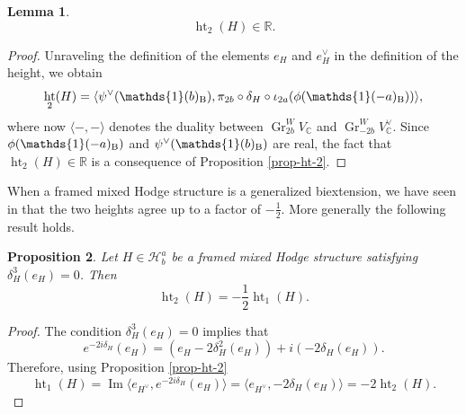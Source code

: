 \documentclass[11pt,a4paper]{amsart}
\newcommand{\Betti}{\text{\rm B}}
\newcommand{\C}{\mathds{C}}
\newcommand{\R}{\mathds{R}}
\newcommand{\caH}{\mathcal{H}}
\newcommand{\bfone}{{\mathds{1}}}
\DeclareMathOperator {\Gr} {Gr}
\DeclareMathOperator{\im}{Im}
\DeclareMathOperator{\Ht}{ht}
\numberwithin{equation}{section}
\theoremstyle{plain}
\newtheorem{prop}{Proposition}[section]
\newtheorem{lem}[prop]{Lemma}
\theoremstyle{definition}
\begin{document}
\begin{lem}\label{lem-2-17}
  \begin{displaymath}
    \Ht_{2}(H)\in \R.
  \end{displaymath}
\end{lem}
\begin{proof}
  Unraveling the definition of the elements $e_H$ and $e_{H}^{\vee}$
  in the definition of the height, we obtain
  \begin{displaymath}
    \Ht_{2}(H)= \langle\psi ^{\vee}(\bfone(b)_{\Betti}),
    \pi _{2b}\circ \delta _{H}\circ \iota _{2a}(\phi (\bfone(-a)_{\Betti}))\rangle,
  \end{displaymath}
  where now $\langle -,- \rangle $ denotes the duality between
  $\Gr_{2b}^{W}V_{\C}$ and $\Gr_{-2b}^{W}V^{\vee}_{\C}$.  Since
  $\phi (\bfone(-a)_{\Betti})$ and $\psi ^{\vee}(\bfone(b)_{\Betti})$ are real, the fact
  that $\Ht_{2}(H)\in \R$ is a consequence of Proposition
  \ref{prop-ht-2}.
\end{proof}

When a framed mixed Hodge structure is a generalized  biextension,
we have seen in \cite[Lemma 2.6]{BGGP:Height} that the two heights
agree up to a factor of $-\frac{1}{2}$.  More generally the following result
holds.

\begin{prop}\label{prop:1} Let $H\in \caH^{a}_{b}$ be a framed mixed Hodge
  structure satisfying $\delta _{H}^{3}(e_H)=0$. Then
  \begin{displaymath}
    \Ht_{2}(H)=-\frac{1}{2}\Ht_{1}(H).
  \end{displaymath}
\end{prop}
\begin{proof}
  The condition $\delta _{H}^{3}(e_{H})=0$ implies that
  \begin{displaymath}
    e^{-2i\delta _{H}} (e_{H}) = (e_{H}-2\delta _{H}^{2}(e_{H}))+ i(-2\delta _{H}(e_{H})).
  \end{displaymath}
  Therefore, using Proposition \ref{prop-ht-2}
  \begin{displaymath}
    \Ht_{1}(H)=\im\langle e_{H^{\vee}},
    e^{-2i\delta_{H}} (e_{H})\rangle
    =
    \langle e_{H^{\vee}},
    -2\delta_{H} (e_{H})\rangle
    =-2\Ht_{2}(H).
  \end{displaymath}
\end{proof}
\end{document}
